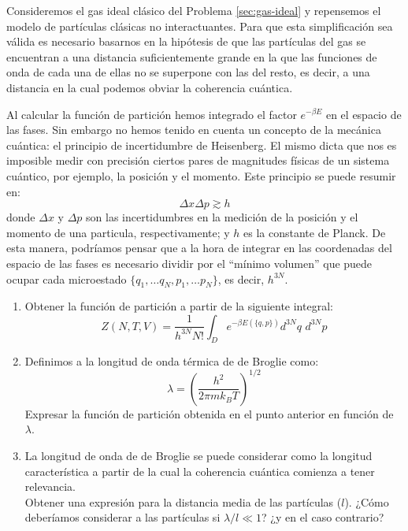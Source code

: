 \documentclass[a4paper,11pt]{article}
\begin{document}
Consideremos el gas ideal clásico del Problema \ref{sec:gas-ideal} y
repensemos el modelo de partículas clásicas no interactuantes. Para que esta
simplificación sea válida es necesario basarnos en la hipótesis de que las
partículas del gas se encuentran a una distancia suficientemente grande en la
que las funciones de onda de cada una de ellas no se superpone con las del
resto, es decir, a una distancia en la cual podemos obviar la coherencia
cuántica.

Al calcular la función de partición hemos integrado el factor
$e^{-\beta E}$ en el espacio de las fases. Sin embargo no hemos tenido
en cuenta un concepto de la mecánica cuántica: el principio de
incertidumbre de Heisenberg. El mismo dicta que nos es imposible medir
con precisión ciertos pares de magnitudes físicas de un sistema
cuántico, por ejemplo, la posición y el momento. Este principio se
puede resumir en:
$$ \Delta x \Delta p \gtrsim  h$$
donde $\Delta x$ y $\Delta p$ son las incertidumbres en la medición de
la posición y el momento de una particula, respectivamente; y $h$ es
la constante de Planck.
De esta manera, podríamos pensar que a la hora de integrar en las
coordenadas del espacio de las fases es necesario dividir por el
``mínimo volumen'' que puede ocupar cada microestado
$\{ q_1, \dots q_N, p_1, \dots p_N \}$, es decir, $h^{3N}$.

\begin{enumerate}[label=(\alph*),
                  leftmargin=2\parindent,
                  rightmargin=2\parindent]

    \item{\label{item:de-broglie-particion}
          Obtener la función de partición a partir de la siguiente
          integral:
          $$
          Z(N, T, V) =
            \frac{1}{h^{3N} N!}
            \int_D e^{-\beta E(\{q, p\})} d^{3N}q \,\, d^{3N}p
          $$
          }

    \item{Definimos a la longitud de onda térmica de de Broglie como:
          $$ \lambda = \left( \frac{h^2}{2\pi m k_B T} \right)^{1/2} $$
          Expresar la función de partición obtenida en el punto
          anterior en función de $\lambda$.
          }

    \item{La longitud de onda de de Broglie se puede considerar como la
          longitud característica a partir de la cual la coherencia
          cuántica comienza a tener relevancia.\\
          Obtener una expresión para la distancia media de las
          partículas ($l$). ¿Cómo deberíamos considerar a las
          partículas si $\lambda/l \ll 1$? ¿y en el caso contrario?
          }

\end{enumerate}
\end{document}
